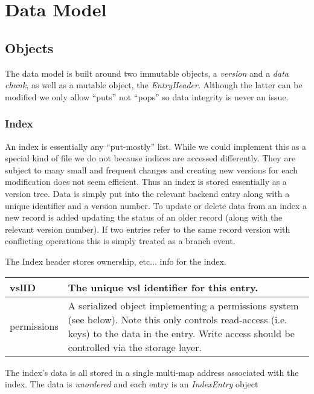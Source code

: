 \documentclass[10pt]{article}
\begin{document}
\section{Data Model}

\subsection{Objects}

The data model is built around two immutable objects, a {\em version} and a {\em
data chunk}, as well as a mutable object, the {\em EntryHeader}.  Although the latter
can be modified we only allow ``puts'' not ``pops'' so data integrity is never
an issue.

\subsubsection{Index}

An index is essentially any ``put-mostly'' list.  While we could implement this
as a special kind of file we do not because indices are accessed differently.
They are subject to many small and frequent changes and creating new versions
for each modification does not seem efficient.  Thus an index is stored
essentially as a version tree.  Data is simply put into the relevant backend
entry along with a unique identifier and a version number.  To update or delete
data from an index a new record is added updating the status of an older record
(along with the relevant version number).  If two entries refer to the same
record version with conflicting operations this is simply treated as a branch
event.

The Index header stores ownership, etc... info for the index.

\begin{tabular}{|l|p{12cm}|}
\hline
vslID & The unique vsl identifier for this entry.\\
\hline
permissions & A serialized object implementing a permissions system (see below).
Note this only controls read-access (i.e. keys) to the data in the entry.  Write
access should be controlled via the storage layer. \\
\hline
\end{tabular}


The index's data is all stored in a single multi-map address associated with the
index.  The data is {\em unordered} and each entry is an {\em IndexEntry}
object
\end{document}
